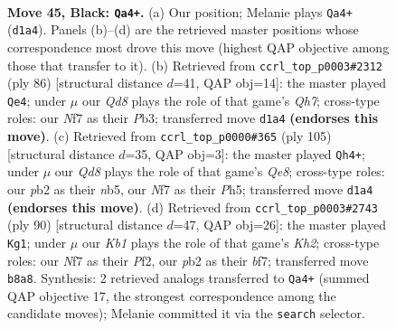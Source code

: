 \documentclass[11pt]{article}
\begin{document}
\clearpage

\begin{figure}[p]\centering
\begin{subfigure}{0.46\textwidth}\centering
\resizebox{\linewidth}{!}{%
\newchessgame
\chessboard[
  setfen={1k6/p1p2npp/1p2Q3/2p3P1/8/2P5/KP6/3q4 b - - 6 45},
  showmover=false,
  pgfstyle=straightmove, color=movearrow, markmove={d1-a4}
]}
\caption{}
\end{subfigure}\hfill
\begin{subfigure}{0.46\textwidth}\centering
\resizebox{\linewidth}{!}{%
\newchessgame
\chessboard[
  setfen={2k5/7Q/p2p3p/1p1P4/8/PPq5/K1P5/8 w - - 1 44},
  showmover=false,
  pgfstyle=straightmove, color=movearrow, markmove={h7-e4}
]}
\caption{}
\end{subfigure}
\\[4pt]
\begin{subfigure}{0.46\textwidth}\centering
\resizebox{\linewidth}{!}{%
\newchessgame
\chessboard[
  setfen={6k1/5p2/4p1p1/pNQ4p/P3P3/5P2/6PK/4q3 b - - 3 53},
  showmover=false,
  pgfstyle=straightmove, color=movearrow, markmove={e1-h4}
]}
\caption{}
\end{subfigure}\hfill
\begin{subfigure}{0.46\textwidth}\centering
\resizebox{\linewidth}{!}{%
\newchessgame
\chessboard[
  setfen={3Q4/5bpk/7p/p7/P4N1P/5qP1/5P1K/8 w - - 7 46},
  showmover=false,
  pgfstyle=straightmove, color=movearrow, markmove={h2-g1}
]}
\caption{}
\end{subfigure}
\caption{\textbf{Move 45, Black: \texttt{Qa4+}.} (a) Our position; Melanie plays \texttt{Qa4+} (\texttt{d1a4}). Panels (b)--(d) are the retrieved master positions whose correspondence most drove this move (highest QAP objective among those that transfer to it). (b) Retrieved from \texttt{ccrl\_top\_p0003\#2312} (ply 86) [structural distance $d$=41, QAP obj=14]: the master played \texttt{Qe4}; under $\mu$ our \emph{Qd8} plays the role of that game's \emph{Qh7}; cross-type roles: our \emph{N}f7 as their \emph{P}b3; transferred move \texttt{d1a4} \textbf{(endorses this move)}. (c) Retrieved from \texttt{ccrl\_top\_p0000\#365} (ply 105) [structural distance $d$=35, QAP obj=3]: the master played \texttt{Qh4+}; under $\mu$ our \emph{Qd8} plays the role of that game's \emph{Qe8}; cross-type roles: our \emph{p}b2 as their \emph{n}b5, our \emph{N}f7 as their \emph{P}h5; transferred move \texttt{d1a4} \textbf{(endorses this move)}. (d) Retrieved from \texttt{ccrl\_top\_p0003\#2743} (ply 90) [structural distance $d$=47, QAP obj=26]: the master played \texttt{Kg1}; under $\mu$ our \emph{Kb1} plays the role of that game's \emph{Kh2}; cross-type roles: our \emph{N}f7 as their \emph{P}f2, our \emph{p}b2 as their \emph{b}f7; transferred move \texttt{b8a8}. Synthesis: 2 retrieved analogs transferred to \texttt{Qa4+} (summed QAP objective 17, the strongest correspondence among the candidate moves); Melanie committed it via the \texttt{search} selector.}
\label{fig:thought-m89}
\end{figure}
\end{document}

